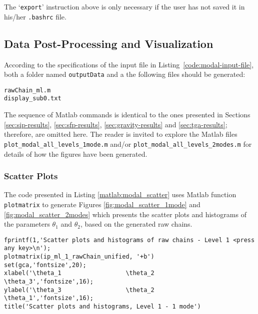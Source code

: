 The `\verb+export+' instruction above is only necessary if the user has not saved it in his/her \verb+.bashrc+ file. 


\subsection{Data Post-Processing and Visualization}\label{sec:modal-results}



According to the specifications of the input file in Listing~\ref{code:modal-input-file}, both a folder named \verb+outputData+ and a the following files should be generated:
\begin{verbatim}
rawChain_ml.m 
display_sub0.txt    
\end{verbatim}


The sequence of Matlab commands is identical to the ones presented in Sections
\ref{sec:sip-results}, \ref{sec:sfp-results}, \ref{sec:gravity-results} and \ref{sec:tga-results};
therefore, are omitted here. The reader is invited to explore the Matlab files
\texttt{plot\_modal\_all\_levels\_1mode.m}  and/or \texttt{plot\_modal\_all\_levels\_2modes.m}  
for details of how the figures have been generated.


\subsubsection{Scatter Plots}

The code presented in Listing \ref{matlab:modal_scatter} uses Matlab function \verb+plotmatrix+ to generate Figures \ref{fig:modal_scatter_1mode} and \ref{fig:modal_scatter_2modes}
which presents the scatter plots and histograms of the parameters $\theta_1$ and $\theta_2$, based on the generated raw chains. 


\begin{lstlisting}[label=matlab:modal_scatter,caption={Matlab code for the scatter plots depicted in Figures \ref{fig:modal_scatter_1mode} and \ref{fig:modal_scatter_2modes}.}]
fprintf(1,'Scatter plots and histograms of raw chains - Level 1 <press any key>\n');
plotmatrix(ip_ml_1_rawChain_unified, '+b')
set(gca,'fontsize',20); 
xlabel('\theta_1                  \theta_2                   \theta_3','fontsize',16);
ylabel('\theta_3                  \theta_2                   \theta_1','fontsize',16);
title('Scatter plots and histograms, Level 1 - 1 mode')
\end{lstlisting}

